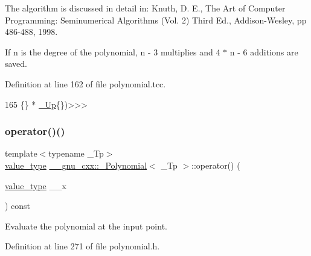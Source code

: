 The algorithm is discussed in detail in\+: Knuth, D. E., The Art of Computer Programming\+: Seminumerical Algorithms (Vol. 2) Third Ed., Addison-\/\+Wesley, pp 486-\/488, 1998.

If n is the degree of the polynomial, n -\/ 3 multiplies and 4 $\ast$ n -\/ 6 additions are saved. 

Definition at line 162 of file polynomial.\+tcc.


\begin{DoxyCode}
165                                                             \{\} * \hyperlink{class____gnu__cxx_1_1__Polynomial_a242114d4b86648a5dff67a8221f80d40}{\_Up}\{\})>>>
\end{DoxyCode}
\mbox{\label{class____gnu__cxx_1_1__Polynomial_a9aa91f3424896c07d51fa09950825549}} 
\subsubsection{\texorpdfstring{operator()()}{operator()()}\hspace{0.1cm}{\footnotesize\ttfamily [2/4]}}
{\footnotesize\ttfamily template$<$typename \+\_\+\+Tp$>$ \\
\hyperlink{class____gnu__cxx_1_1__Polynomial_a725563351f50e76084a7a016c06f8a53}{value\+\_\+type} \hyperlink{class____gnu__cxx_1_1__Polynomial}{\+\_\+\+\_\+gnu\+\_\+cxx\+::\+\_\+\+Polynomial}$<$ \+\_\+\+Tp $>$\+::operator() (\begin{DoxyParamCaption}\item[{\hyperlink{class____gnu__cxx_1_1__Polynomial_a725563351f50e76084a7a016c06f8a53}{value\+\_\+type}}]{\+\_\+\+\_\+x }\end{DoxyParamCaption}) const\hspace{0.3cm}{\ttfamily [inline]}}

Evaluate the polynomial at the input point. 

Definition at line 271 of file polynomial.\+h.


